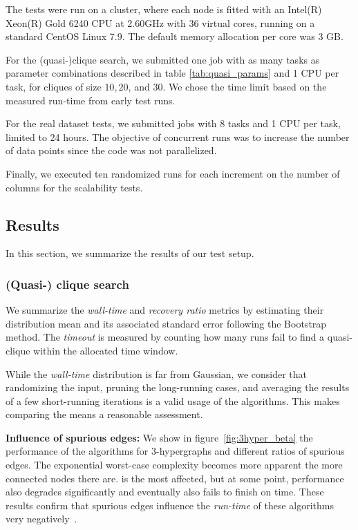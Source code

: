 The tests were run on a cluster, where each node
is fitted with an Intel(R) Xeon(R) Gold 6240 CPU at 2.60GHz with 36 virtual cores,
running on a standard CentOS Linux 7.9. The default memory allocation per core was
3 GB. 

For the (quasi-)clique search, we submitted one job with as many tasks as
parameter combinations described in table \ref{tab:quasi_params} and 1 CPU per task,
for cliques of size $10, 20$, and $30$.  We chose the time limit based on the measured
run-time from early test runs.

For the real dataset tests, we submitted jobs with 8 tasks and 1 CPU per task,
limited to 24 hours. The objective of concurrent runs was to increase the number
of data points since the code was not parallelized.

Finally, we executed ten randomized runs for each increment on the number of columns for the scalability tests.

\subsection{Results}
\label{sec:results}

In this section, we summarize the results of our test setup.

\subsubsection{(Quasi-) clique search}
\label{sec:result_quasi_search}

We summarize the \emph{wall-time} and \emph{recovery ratio} metrics by estimating
their distribution mean and its associated standard error following the Bootstrap method.
The \emph{timeout} is measured by counting how many runs fail to find a quasi-clique within
the allocated time window.

While the \emph{wall-time} distribution is far from Gaussian, we consider that randomizing the
input, pruning the long-running cases, and averaging the results of a few
short-running iterations is a valid usage of the algorithms.
This makes comparing the means a reasonable assessment.

\textbf{Influence of spurious edges:}
We show in figure~\ref{fig:3hyper_beta} the performance of the algorithms for $3$-hypergraphs
and different ratios of spurious edges. The exponential worst-case
complexity becomes more apparent the more connected nodes there are.
\Find is the most affected, but at some point, \PresQ performance also degrades significantly and eventually also fails to finish on time.
These results confirm that spurious edges influence the
\emph{run-time} of these algorithms very negatively~\cite{koeller2006heuristic}.

